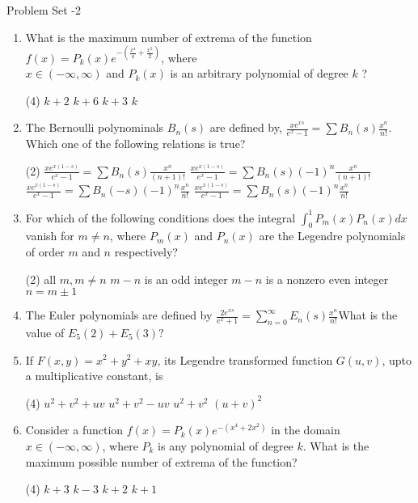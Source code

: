 \begin{abox}
	Problem Set -2
\end{abox}
\begin{enumerate}[label=\color{ocre}\textbf{\arabic*.}]
	\item What is the maximum number of extrema of the function $f(x)=P_{k}(x) e^{-\left(\frac{x^{4}}{4}+\frac{x^{2}}{2}\right)}$, where\\
	$x \in(-\infty, \infty)$ and $P_{k}(x)$ is an arbitrary polynomial of degree $k$ ?
{	}

\begin{tasks}(4)
\task[\textbf{A.}]  $k+2$
\task[\textbf{B.}]$k+6$
\task[\textbf{C.}] $k+3$
\task[\textbf{D.}]$k$
\end{tasks}
\item The Bernoulli polynominals $B_{n}(s)$ are defined by, $\frac{x e^{x s}}{e^{x}-1}=\sum B_{n}(s) \frac{x^{n}}{n !} .$ Which one of the following relations is true?
{}

\begin{tasks}(2)
\task[\textbf{A.}] $\frac{x e^{x(1-s)}}{e^{x}-1}=\sum B_{n}(s) \frac{x^{n}}{(n+1) !}$
\task[\textbf{B.}]$\frac{x e^{x(1-s)}}{e^{x}-1}=\sum B_{n}(s)(-1)^{n} \frac{x^{n}}{(n+1) !}$
\task[\textbf{C.}]$\frac{x e^{x(1-s)}}{e^{x}-1}=\sum B_{n}(-s)(-1)^{n} \frac{x^{n}}{n !}$
\task[\textbf{D.}]$\frac{x e^{x(1-s)}}{e^{x}-1}=\sum B_{n}(s)(-1)^{n} \frac{x^{n}}{n !}$
\end{tasks}
\item For which of the following conditions does the integral $\int_{0}^{1} P_{m}(x) P_{n}(x) d x$ vanish for $m \neq n$, where $P_{m}(x)$ and $P_{n}(x)$ are the Legendre polynomials of order $m$ and $n$ respectively?
{}

\begin{tasks}(2)
\task[\textbf{A.}] all $m, m \neq n$
\task[\textbf{B.}]$m-n$ is an odd integer
\task[\textbf{C.}]$m-n$ is a nonzero even integer
\task[\textbf{D.}]$n=m \pm 1$
\end{tasks}
\item The Euler polynomials are defined by $\frac{2 e^{x s}}{e^{x}+1}=\sum_{n=0}^{\infty} E_{n}(s) \frac{x^{n}}{n !}$What is the value of $E_{5}(2)+E_{5}(3) ?$
{}
\item If $F(x, y)=x^{2}+y^{2}+x y$, its Legendre transformed function $G(u, v)$, upto a multiplicative constant, is
{}

\begin{tasks}(4)
\task[\textbf{A.}] $u^{2}+v^{2}+u v$
\task[\textbf{B.}] $u^{2}+v^{2}-u v$
\task[\textbf{C.}]$u^{2}+v^{2}$
\task[\textbf{D.}]$(u+v)^{2}$
\end{tasks}
\item  Consider a function $f(x)=P_{k}(x) e^{-\left(x^{4}+2 x^{2}\right)}$ in the domain $x \in(-\infty, \infty)$, where $P_{k}$ is any polynomial of degree $k$. What is the maximum possible number of extrema of the function?
{}

\begin{tasks}(4)
\task[\textbf{A.}] $k+3$
\task[\textbf{B.}] $k-3$
\task[\textbf{C.}]$k+2$
\task[\textbf{D.}]$k+1$
\end{tasks}
\end{enumerate}

